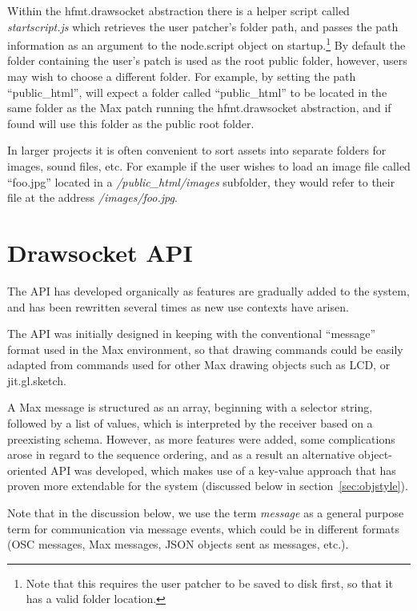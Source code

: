 Within the hfmt.drawsocket abstraction there is a helper script called \textit{startscript.js} which retrieves the user patcher's folder path, and passes the path information as an argument to the node.script object on startup.\footnote{Note that this requires the user patcher to be saved to disk first, so that it has a valid folder location.}
By default the folder containing the user's patch is used as the root public folder, however, users may wish to choose a different folder. 
For example, by setting the path ``public\_html'', \drawsocket will expect a folder called ``public\_html'' to be located in the same folder as the Max patch running the hfmt.drawsocket abstraction, and if found will use this folder as the public root folder.

In larger projects it is often convenient to sort assets into separate folders for images, sound files, etc. For example if the user wishes to load an image file called ``foo.jpg'' located in a \textit{/public\_html/images} subfolder, they would refer to their file at the address \textit{/images/foo.jpg}.

\section{Drawsocket API}\label{sec:api}
The \drawsocket API has developed organically as features are gradually added to the system, and has been rewritten several times as new use contexts have arisen.

The API was initially designed in keeping with the conventional ``message'' format used in the Max environment, so that drawing commands could be easily adapted from commands used for other Max drawing objects such as LCD, or jit.gl.sketch.

A Max message is structured as an array, beginning with a selector string, followed by a list of values, which is interpreted by the receiver based on a preexisting schema.
However, as more features were added, some complications arose in regard to the sequence ordering, and as a result an alternative object-oriented API was developed, which makes use of a key-value approach that has proven more extendable for the \drawsocket system (discussed below in section~\ref{sec:objstyle}).

Note that in the discussion below, we use the term \textit{message} as a general purpose term for communication via message events, which could be in different formats (OSC messages, Max messages, JSON objects sent as messages, etc.).


